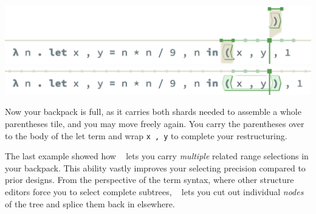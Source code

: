 \begin{center}
  \includegraphics[width=\columnwidth]{img/multi-restructure-8.png}
  \includegraphics[width=\columnwidth]{img/multi-restructure-9.png}
\end{center}




Now your backpack is full, as it carries both shards
needed to assemble a whole parentheses tile,
and you may move freely again.
You carry the parentheses over to the body of the
let term and wrap \texttt{x , y} to complete your
restructuring.

The last example showed how \tylr~ lets you carry \emph{multiple}
related range selections in your backpack.
This ability vastly improves your selecting precision
compared to prior designs.
From the perspective of the term syntax,
where other structure editors force you to select
complete subtrees, \tylr~ lets you cut out individual
\emph{nodes} of the tree and splice them back in
elsewhere.

